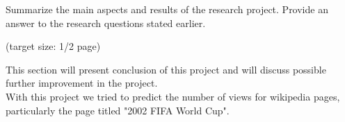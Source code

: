   Summarize the main aspects and results of the research
  project. Provide an answer to the research questions stated earlier.

  (target size: 1/2 page)
  
  This section will present conclusion of this project and will discuss possible further improvement in the project.\\
  With this project we tried to predict the number of views for wikipedia pages, particularly the page titled "2002 FIFA World Cup".